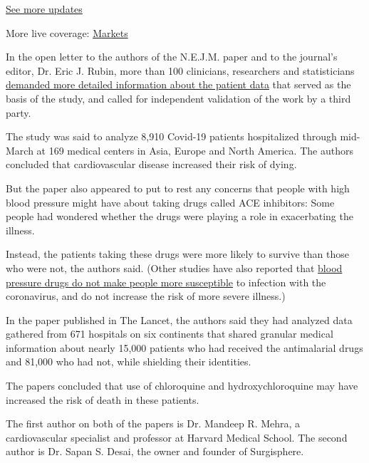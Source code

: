 \href{https://www.nytimes3xbfgragh.onion/2020/09/08/world/covid-19-coronavirus.html?action=click\&pgtype=Article\&state=default\&region=MAIN_CONTENT_1\&context=storylines_live_updates}{See
more updates}

More live coverage:
\href{https://www.nytimes3xbfgragh.onion/live/2020/09/08/business/stock-market-today-coronavirus?action=click\&pgtype=Article\&state=default\&region=MAIN_CONTENT_1\&context=storylines_live_updates}{Markets}

In the open letter to the authors of the N.E.J.M. paper and to the
journal's editor, Dr. Eric J. Rubin, more than 100 clinicians,
researchers and statisticians
\href{https://zenodo.org/record/3873178\#.XtZkDxNKjOS}{demanded more
detailed information about the patient data} that served as the basis of
the study, and called for independent validation of the work by a third
party.

The study was said to analyze 8,910 Covid-19 patients hospitalized
through mid-March at 169 medical centers in Asia, Europe and North
America. The authors concluded that cardiovascular disease increased
their risk of dying.

But the paper also appeared to put to rest any concerns that people with
high blood pressure might have about taking drugs called ACE inhibitors:
Some people had wondered whether the drugs were playing a role in
exacerbating the illness.

Instead, the patients taking these drugs were more likely to survive
than those who were not, the authors said. (Other studies have also
reported that
\href{https://www.nytimes3xbfgragh.onion/2020/05/01/health/blood-pressure-drugs-coronavirus.html}{blood
pressure drugs do not make people more susceptible} to infection with
the coronavirus, and do not increase the risk of more severe illness.)

In the paper published in The Lancet, the authors said they had analyzed
data gathered from 671 hospitals on six continents that shared granular
medical information about nearly 15,000 patients who had received the
antimalarial drugs and 81,000 who had not, while shielding their
identities.

The papers concluded that use of chloroquine and hydroxychloroquine may
have increased the risk of death in these patients.

The first author on both of the papers is Dr. Mandeep R. Mehra, a
cardiovascular specialist and professor at Harvard Medical School. The
second author is Dr. Sapan S. Desai, the owner and founder of
Surgisphere.

